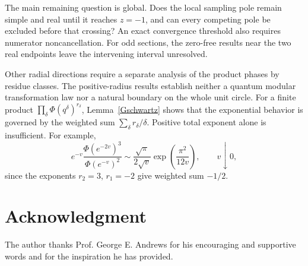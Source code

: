 \documentclass[11pt]{amsart}
\theoremstyle{definition}
\theoremstyle{remark}
\numberwithin{equation}{section}
\begin{document}
The main remaining question is global. Does the local sampling pole remain
simple and real until it reaches $z=-1$, and can every competing pole be
excluded before that crossing? An exact convergence threshold also requires
numerator noncancellation. For odd sections, the zero-free results near the
two real endpoints leave the intervening interval unresolved.

Other radial directions require a separate analysis of the product phases
by residue classes. The positive-radius results establish neither a quantum
modular transformation law nor a natural boundary on the whole unit circle.
For a finite product $\prod_\delta\Phi(q^\delta)^{r_\delta}$,
Lemma~\ref{Gschwartz} shows that the exponential behavior is governed by
the weighted sum $\sum_\delta r_\delta/\delta$.
Positive total exponent alone is insufficient. For example,
\[
 e^{-v}\frac{\Phi(e^{-2v})^3}{\Phi(e^{-v})^2}
 \sim\frac{\sqrt\pi}{2\sqrt v}\exp\!\left(\frac{\pi^2}{12v}\right),
 \qquad v\downarrow0,
\]
since the exponents $r_2=3$, $r_1=-2$ give weighted sum $-1/2$.

\section*{Acknowledgment}
The author thanks Prof. George E. Andrews for his encouraging and
supportive words and for the inspiration he has provided.
\end{document}
